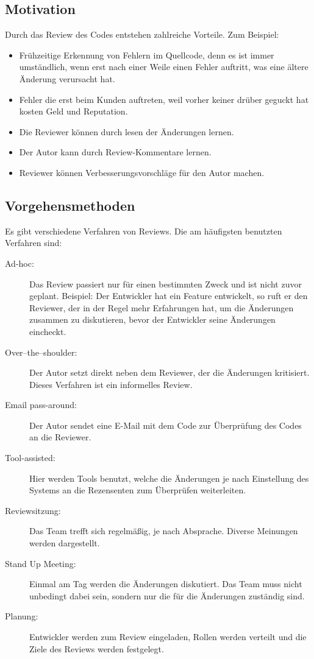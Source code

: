\subsection{Motivation}
\label{subsec:Gründe}
Durch das Review des Codes entstehen zahlreiche Vorteile. Zum Beispiel:

\begin{itemize}
	\item Frühzeitige Erkennung von Fehlern im Quellcode, denn es ist immer umständlich, wenn erst nach einer Weile einen Fehler auftritt, was eine ältere Änderung verursacht hat.
		
	\item Fehler die erst beim Kunden auftreten, weil vorher keiner drüber geguckt hat kosten Geld und Reputation.
	\item Die Reviewer können durch lesen der Änderungen lernen.
	\item Der Autor kann durch Review-Kommentare lernen.
	\item Reviewer können Verbesserungsvorschläge für den Autor machen.
\end{itemize}

\subsection{Vorgehensmethoden}
\label{subsec:Vorgehensmethoden}
Es gibt verschiedene Verfahren von Reviews. Die am häufigsten benutzten Verfahren sind:

\begin{description}
	\item [Ad-hoc:] Das Review passiert nur für einen bestimmten Zweck und ist nicht zuvor geplant. Beispiel: Der Entwickler hat ein Feature entwickelt, so ruft er den Reviewer, der in 				der Regel mehr Erfahrungen hat, um die Änderungen zusammen zu diskutieren, bevor der Entwickler seine Änderungen eincheckt.
	\item [Over–the–shoulder:] Der Autor setzt direkt neben dem Reviewer, der die Änderungen kritisiert. Dieses Verfahren ist ein informelles Review.
	\item [Email pass-around:] Der Autor sendet eine E-Mail mit dem Code zur Überprüfung des Codes an die Reviewer.
	\item [Tool-assisted:] Hier werden Tools benutzt, welche die Änderungen je nach Einstellung des Systems an die Rezensenten zum Überprüfen weiterleiten.
	\item [Reviewsitzung:] Das Team trefft sich regelmäßig, je nach Absprache. Diverse Meinungen werden dargestellt.
	\item [Stand Up Meeting:] Einmal am Tag werden die Änderungen diskutiert. Das Team muss nicht unbedingt dabei sein, sondern nur die für die Änderungen zuständig sind.
	\item [Planung:] Entwickler werden zum Review eingeladen, Rollen werden verteilt und die Ziele des Reviews werden festgelegt.
\end{description}

